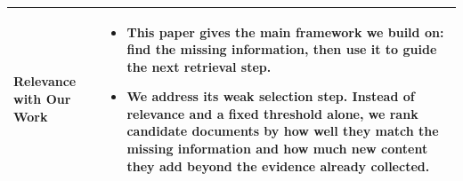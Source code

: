 \documentclass[12pt,a4paper]{report}
\begin{document}
\begin{longtable}{|p{1.25in}|p{5.15in}|}
\textbf{Relevance with Our Work} &
\begin{itemize}[leftmargin=0.18in,itemsep=0.05in,topsep=0pt,parsep=0pt]
\item This paper gives the main framework we build on: find the missing information, then use it to guide the next retrieval step.
\item We address its weak selection step. Instead of relevance and a fixed threshold alone, we rank candidate documents by how well they match the missing information and how much new content they add beyond the evidence already collected.
\end{itemize} \\ \hline
\end{longtable}
\clearpage


\end{document}
